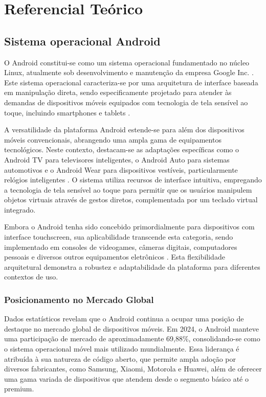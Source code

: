 \chapter{Referencial Teórico}\label{sec:RefTeorico}
\section{Sistema operacional Android}

O Android constitui-se como um sistema operacional fundamentado no núcleo Linux, atualmente sob desenvolvimento e manutenção da empresa Google Inc. \cite{google2023}. Este sistema operacional caracteriza-se por uma arquitetura de interface baseada em manipulação direta, sendo especificamente projetado para atender às demandas de dispositivos móveis equipados com tecnologia de tela sensível ao toque, incluindo smartphones e tablets \cite{burnette2021}.

A versatilidade da plataforma Android estende-se para além dos dispositivos móveis convencionais, abrangendo uma ampla gama de equipamentos tecnológicos. Neste contexto, destacam-se as adaptações específicas como o Android TV para televisores inteligentes, o Android Auto para sistemas automotivos e o Android Wear para dispositivos vestíveis, particularmente relógios inteligentes \cite{ableson2022}. O sistema utiliza recursos de interface intuitiva, empregando a tecnologia de tela sensível ao toque para permitir que os usuários manipulem objetos virtuais através de gestos diretos, complementada por um teclado virtual integrado.

Embora o Android tenha sido concebido primordialmente para dispositivos com interface touchscreen, sua aplicabilidade transcende esta categoria, sendo implementado em consoles de videogames, câmeras digitais, computadores pessoais e diversos outros equipamentos eletrônicos \cite{murphy2023}. Esta flexibilidade arquitetural demonstra a robustez e adaptabilidade da plataforma para diferentes contextos de uso.

\subsection{Posicionamento no Mercado Global}
Dados estatísticos revelam que o Android continua a ocupar uma posição de destaque no mercado global de dispositivos móveis. Em 2024, o Android manteve uma participação de mercado de aproximadamente 69,88\%, consolidando-se como o sistema operacional móvel mais utilizado mundialmente\cite{bankmycell2025}. Essa liderança é atribuída à sua natureza de código aberto, que permite ampla adoção por diversos fabricantes, como Samsung, Xiaomi, Motorola e Huawei, além de oferecer uma gama variada de dispositivos que atendem desde o segmento básico até o premium.

